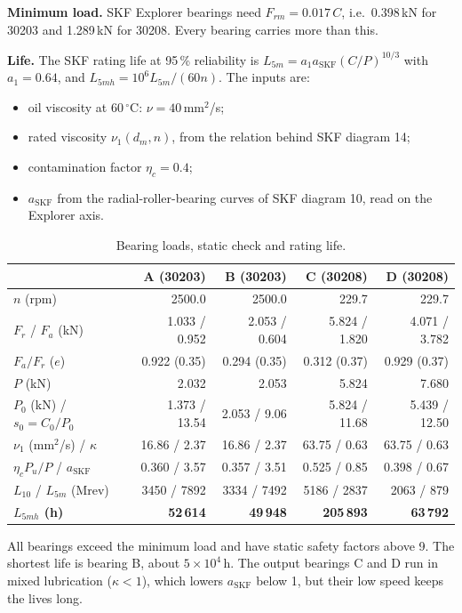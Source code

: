 \documentclass[11pt,a4paper]{article}
\begin{document}
\textbf{Minimum load.} SKF Explorer bearings need $F_{rm}=0.017\,C$, i.e.\ 0.398\,kN for 30203 and 1.289\,kN for 30208. Every bearing carries more than this.

\textbf{Life.} The SKF rating life at 95\,\% reliability is $L_{5m}=a_1a_{\mathrm{SKF}}(C/P)^{10/3}$ with $a_1=0.64$, and $L_{5mh}=10^6L_{5m}/(60n)$. The inputs are:
\begin{itemize}
\item oil viscosity at 60\,$^\circ$C: $\nu=40$\,mm$^2$/s;
\item rated viscosity $\nu_1(d_m,n)$, from the relation behind SKF diagram 14;
\item contamination factor $\eta_c=0.4$;
\item $a_{\mathrm{SKF}}$ from the radial-roller-bearing curves of SKF diagram 10, read on the Explorer axis.
\end{itemize}

\begin{table}[H]\centering\small
\caption{Bearing loads, static check and rating life.}
\begin{tabular}{lrrrr}\toprule
 & A (30203) & B (30203) & C (30208) & D (30208)\\\midrule
$n$ (rpm) & 2500.0 & 2500.0 & 229.7 & 229.7\\
$F_r$ / $F_a$ (kN) & 1.033 / 0.952 & 2.053 / 0.604 & 5.824 / 1.820 & 4.071 / 3.782\\
$F_a/F_r$ ($e$) & 0.922 (0.35) & 0.294 (0.35) & 0.312 (0.37) & 0.929 (0.37)\\
$P$ (kN) & 2.032 & 2.053 & 5.824 & 7.680\\
$P_0$ (kN) / $s_0=C_0/P_0$ & 1.373 / 13.54 & 2.053 / 9.06 & 5.824 / 11.68 & 5.439 / 12.50\\
$\nu_1$ (mm$^2$/s) / $\kappa$ & 16.86 / 2.37 & 16.86 / 2.37 & 63.75 / 0.63 & 63.75 / 0.63\\
$\eta_cP_u/P$ / $a_{\mathrm{SKF}}$ & 0.360 / 3.57 & 0.357 / 3.51 & 0.525 / 0.85 & 0.398 / 0.67\\
$L_{10}$ / $L_{5m}$ (Mrev) & 3450 / 7892 & 3334 / 7492 & 5186 / 2837 & 2063 / 879\\
\textbf{$L_{5mh}$ (h)} & \textbf{52\,614} & \textbf{49\,948} & \textbf{205\,893} & \textbf{63\,792}\\\bottomrule
\end{tabular}\end{table}
All bearings exceed the minimum load and have static safety factors above 9. The shortest life is bearing B, about $5\times10^4$\,h. The output bearings C and D run in mixed lubrication ($\kappa<1$), which lowers $a_{\mathrm{SKF}}$ below 1, but their low speed keeps the lives long.
\end{document}
